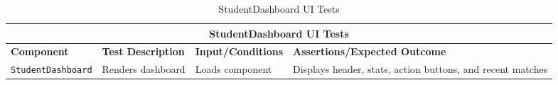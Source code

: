 \begin{table}[ht]
\centering
\begin{tabular}{|p{3.5cm}|p{4cm}|p{4cm}|p{5cm}|}
\hline
\multicolumn{4}{|c|}{\textbf{StudentDashboard UI Tests}} \\
\hline
\textbf{Component} & \textbf{Test Description} & \textbf{Input/Conditions} & \textbf{Assertions/Expected Outcome} \\
\hline
\texttt{StudentDashboard} 
 & Renders dashboard 
 & Loads component 
 & Displays header, stats, action buttons, and recent matches \\
\hline
\end{tabular}
\caption{StudentDashboard UI Tests}
\label{tab:studentdashboard_ui_tests}
\end{table}

